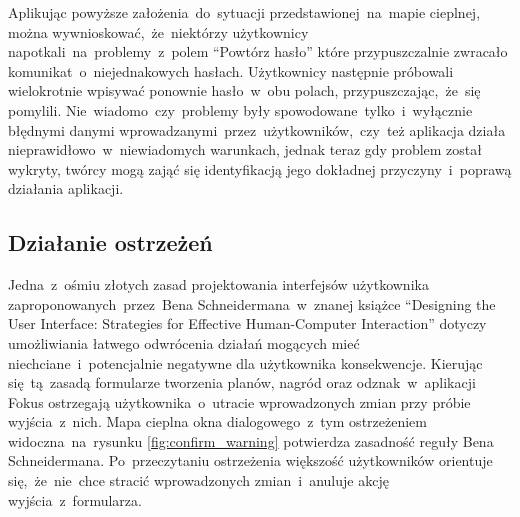 \bigskip
{}

Aplikując powyższe założenia~do~sytuacji przedstawionej~na~mapie cieplnej, można wywnioskować,~że~niektórzy użytkownicy napotkali~na~problemy~z~polem ``Powtórz hasło'' które przypuszczalnie zwracało komunikat~o~niejednakowych hasłach. Użytkownicy następnie próbowali wielokrotnie wpisywać ponownie hasło~w~obu polach, przypuszczając,~że~się pomylili. Nie~wiadomo~czy~problemy były spowodowane~tylko~i~wyłącznie błędnymi danymi wprowadzanymi~przez~użytkowników,~czy~też aplikacja działa nieprawidłowo~w~niewiadomych warunkach, jednak teraz gdy problem został wykryty, twórcy mogą zająć się identyfikacją jego dokładnej przyczyny~i~poprawą działania aplikacji.

\subsection{Działanie ostrzeżeń}
Jedna~z~ośmiu złotych zasad projektowania interfejsów użytkownika zaproponowanych~przez~Bena Schneidermana~w~znanej książce ``Designing the User Interface: Strategies for Effective Human-Computer Interaction'' \cite{Designing_IU} dotyczy umożliwiania łatwego odwrócenia działań mogących mieć niechciane~i~potencjalnie negatywne dla użytkownika konsekwencje. Kierując się~tą~zasadą formularze tworzenia planów, nagród oraz odznak~w~aplikacji Fokus ostrzegają użytkownika~o~utracie wprowadzonych zmian przy próbie wyjścia~z~nich. Mapa cieplna okna dialogowego~z~tym ostrzeżeniem widoczna~na~rysunku \ref{fig:confirm_warning} potwierdza zasadność reguły Bena Schneidermana. Po~przeczytaniu ostrzeżenia większość użytkowników orientuje się,~że~nie~chce stracić wprowadzonych zmian~i~anuluje akcję wyjścia~z~formularza.

\bigskip
{}
